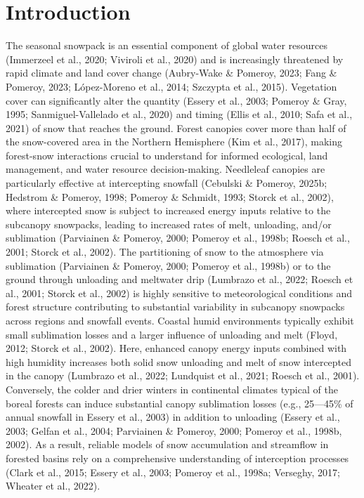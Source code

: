 \documentclass[
]{agujournal2019}
\begin{document}
\section{Introduction}\label{introduction}

The seasonal snowpack is an essential component of global water
resources (Immerzeel et al., 2020; Viviroli et al., 2020) and is
increasingly threatened by rapid climate and land cover change
(Aubry-Wake \& Pomeroy, 2023; Fang \& Pomeroy, 2023; López-Moreno et
al., 2014; Szczypta et al., 2015). Vegetation cover can significantly
alter the quantity (Essery et al., 2003; Pomeroy \& Gray, 1995;
Sanmiguel-Vallelado et al., 2020) and timing (Ellis et al., 2010; Safa
et al., 2021) of snow that reaches the ground. Forest canopies cover
more than half of the snow-covered area in the Northern Hemisphere (Kim
et al., 2017), making forest-snow interactions crucial to understand for
informed ecological, land management, and water resource
decision-making. Needleleaf canopies are particularly effective at
intercepting snowfall (Cebulski \& Pomeroy, 2025b; Hedstrom \& Pomeroy,
1998; Pomeroy \& Schmidt, 1993; Storck et al., 2002), where intercepted
snow is subject to increased energy inputs relative to the subcanopy
snowpacks, leading to increased rates of melt, unloading, and/or
sublimation (Parviainen \& Pomeroy, 2000; Pomeroy et al., 1998b; Roesch
et al., 2001; Storck et al., 2002). The partitioning of snow to the
atmosphere via sublimation (Parviainen \& Pomeroy, 2000; Pomeroy et al.,
1998b) or to the ground through unloading and meltwater drip (Lumbrazo
et al., 2022; Roesch et al., 2001; Storck et al., 2002) is highly
sensitive to meteorological conditions and forest structure contributing
to substantial variability in subcanopy snowpacks across regions and
snowfall events. Coastal humid environments typically exhibit small
sublimation losses and a larger influence of unloading and melt (Floyd,
2012; Storck et al., 2002). Here, enhanced canopy energy inputs combined
with high humidity increases both solid snow unloading and melt of snow
intercepted in the canopy (Lumbrazo et al., 2022; Lundquist et al.,
2021; Roesch et al., 2001). Conversely, the colder and drier winters in
continental climates typical of the boreal forests can induce
substantial canopy sublimation losses (e.g., 25---45\% of annual
snowfall in Essery et al., 2003) in addition to unloading (Essery et
al., 2003; Gelfan et al., 2004; Parviainen \& Pomeroy, 2000; Pomeroy et
al., 1998b, 2002). As a result, reliable models of snow accumulation and
streamflow in forested basins rely on a comprehensive understanding of
interception processes (Clark et al., 2015; Essery et al., 2003; Pomeroy
et al., 1998a; Verseghy, 2017; Wheater et al., 2022).
\end{document}
